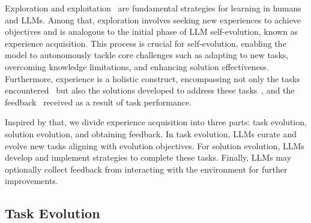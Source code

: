 \documentclass[sn-basic, Numbered]{sn-jnl}%
\theoremstyle{thmstyleone}%
\theoremstyle{thmstyletwo}%
\theoremstyle{thmstylethree}%
\begin{document}


Exploration and exploitation~\cite{gupta2006interplay} are fundamental strategies for learning in humans and LLMs. 
Among that, exploration involves seeking new experiences to achieve objectives and is analogous to the initial phase of LLM self-evolution, known as experience acquisition. This process is crucial for self-evolution, enabling the model to autonomously tackle core challenges such as adapting to new tasks, overcoming knowledge limitations, and enhancing solution effectiveness.
Furthermore, experience is a holistic construct, encompassing not only the tasks encountered~\cite{dewey1938experience} but also the solutions developed to address these tasks~\cite{schon2017reflective}, and the feedback~\cite{boud2013reflection} received as a result of task performance.

Inspired by that, we divide experience acquisition into three parts: task evolution, solution evolution, and obtaining feedback. In task evolution, LLMs curate and evolve new tasks aligning with evolution objectives. For solution evolution, LLMs develop and implement strategies to complete these tasks. Finally, LLMs may optionally collect feedback from interacting with the environment for further improvements.

\subsection{Task Evolution}
\label{sec:task evol}
\end{document}
